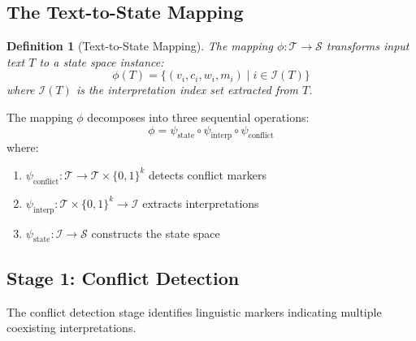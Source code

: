 \documentclass[11pt,a4paper]{article}
\newtheorem{definition}{Definition}
\begin{document}
\subsection{The Text-to-State Mapping}

\begin{definition}[Text-to-State Mapping]
The mapping $\phi: \mathcal{T} \to \mathcal{S}$ transforms input text $T$ 
to a state space instance:
\begin{equation}
\phi(T) = \{(v_i, c_i, w_i, m_i) \mid i \in \mathcal{I}(T)\}
\end{equation}
where $\mathcal{I}(T)$ is the \textit{interpretation index set} extracted from $T$.
\end{definition}

The mapping $\phi$ decomposes into three sequential operations:
\begin{equation}
\phi = \psi_{\text{state}} \circ \psi_{\text{interp}} \circ \psi_{\text{conflict}}
\end{equation}
where:
\begin{enumerate}
    \item $\psi_{\text{conflict}}: \mathcal{T} \to \mathcal{T} \times \{0,1\}^k$ 
          detects conflict markers
    \item $\psi_{\text{interp}}: \mathcal{T} \times \{0,1\}^k \to \mathcal{I}$ 
          extracts interpretations
    \item $\psi_{\text{state}}: \mathcal{I} \to \mathcal{S}$ 
          constructs the state space
\end{enumerate}

\subsection{Stage 1: Conflict Detection}

The conflict detection stage identifies linguistic markers indicating 
multiple coexisting interpretations.
\end{document}
